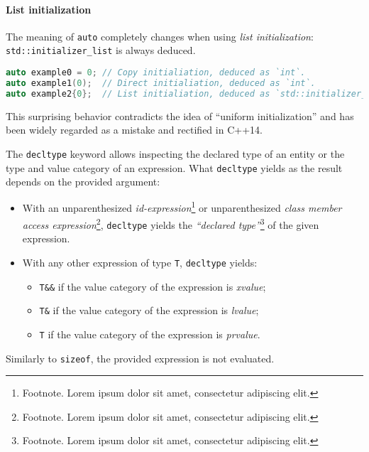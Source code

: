 \documentclass[twoside,10pt,letterpaper,usenames]{newstyle-PearsonGeneric-7-38}
\begin{document}
\paragraph[List initialization]{List initialization}\label{list-initialization}

The meaning of \texttt{auto} completely changes when using \emph{list
initialization}: \texttt{std::initializer\_list} is always deduced.

\begin{lstlisting}[language=C++, caption={missing caption}, label={testlabel}, frame=tb]
auto example0 = 0; // Copy initialiation, deduced as `int`.
auto example1(0);  // Direct initialiation, deduced as `int`.
auto example2{0};  // List initialiation, deduced as `std::initializer_list<int>`.
\end{lstlisting}
    

This surprising behavior contradicts the idea of ``uniform
initialization'' and has been widely regarded as a mistake and rectified
in C++14.

The \texttt{decltype} keyword allows inspecting the declared type of an
entity or the type and value category of an expression. What
\texttt{decltype} yields as the result depends on the provided argument:

\begin{itemize}
\item{With an unparenthesized \emph{id-expression}\cprotect\footnote{Footnote. Lorem ipsum dolor sit amet, consectetur adipiscing elit.} or unparenthesized \emph{class member access expression}\cprotect\footnote{Footnote. Lorem ipsum dolor sit amet, consectetur adipiscing elit.}, \texttt{decltype} yields the \emph{``declared type''}\cprotect\footnote{Footnote. Lorem ipsum dolor sit amet, consectetur adipiscing elit.} of the given expression.}
\item{With any other expression of type \texttt{T}, \texttt{decltype} yields:\begin{itemize}
\item{\texttt{T\&\&} if the value category of the expression is \emph{xvalue};}
\item{\texttt{T\&} if the value category of the expression is \emph{lvalue};}
\item{\texttt{T} if the value category of the expression is \emph{prvalue}.}
\end{itemize}
}
\end{itemize}

Similarly to \texttt{sizeof}, the provided expression is not evaluated.
\end{document}
